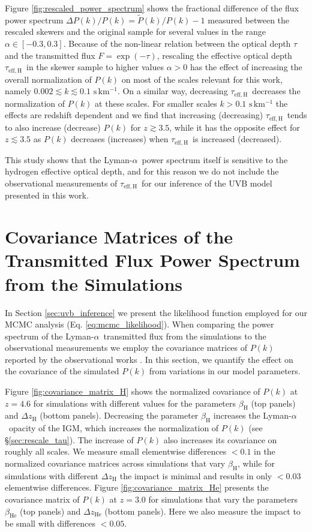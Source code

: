\documentclass[twocolumn]{aastex62}
\newcommand\Lya{Lyman-$\alpha$}
\newcommand\taueffH{$\tau_{\mathrm{eff,H}}$~}
\begin{document}
Figure \ref{fig:rescaled_power_spectrum} shows the fractional difference of the flux power 
spectrum  $\Delta P(k) / P(k) = \widetilde{P}(k)/P(k) - 1 $  
measured between the rescaled skewers and
the original sample for several values 
in the range $\alpha\in[-0.3, 0.3]$.
Because of the non-linear relation between the optical depth $\tau$ and the transmitted flux $F =\exp(-\tau)$, 
rescaling the effective optical depth \taueffH in the skewer sample to higher 
values $\alpha>0$ has the effect of increasing the overall normalization of $P(k)$ on most of
the scales relevant for this work, namely $0.002 \lesssim k \lesssim 0.1 \,\, \mathrm{s\,km^{-1}}$. 
On a similar way, decreasing \taueffH decreases the normalization of $P(k)$ at these scales. For smaller scales 
$k > 0.1 \,\, \mathrm{s\,km^{-1}}$ the effects are redshift dependent and we find that increasing (decreasing) \taueffH tends
to also increase (decrease) $P(k)$ for $z\gtrsim 3.5$, while it has the opposite effect for $z\lesssim 3.5$ as $P(k)$ decreases (increases)
when \taueffH is increased (decreased).

This study shows that the \Lya\ power spectrum itself is sensitive
to the hydrogen effective optical depth, and for this reason
we do not include the observational measurements of \taueffH for our inference of the UVB model presented in this work.           


\section{Covariance Matrices of the Transmitted Flux Power Spectrum from the Simulations  } 
\label{sec:covariance_matrices}


In Section \ref{sec:uvb_inference} we present the likelihood function employed for our MCMC analysis (Eq. \ref{eq:mcmc_likelihood}). When
comparing the power spectrum of the \Lya\ transmitted flux from the simulations to the observational measurements
we employ the covariance matrices 
of $P(k)$ reported by the observational works \citep{Chabanier+2019, Irsic+2017a, boera2019a}.
In this section, we quantify 
the effect on the covariance of the simulated $P(k)$ from variations in our model 
parameters.

Figure \ref{fig:covariance_matrix_H} shows the normalized covariance of $P(k)$ at $z=4.6$ for simulations with different 
values for the parameters $\beta_{\mathrm{H}}$ (top panels) and $\Delta z_{\mathrm{H}}$ (bottom panels). 
Decreasing the parameter $\beta_{\mathrm{H}}$ increases the \Lya\ opacity of the IGM,
which increases the normalization of $P(k)$ (see \S\ref{sec:rescale_tau}). The increase of $P(k)$ also increases its covariance on 
roughly all scales. We measure small elementwise differences $<0.1$ in the normalized covariance matrices across simulations that 
vary $\beta_{\mathrm{H}}$, while for simulations with different $\Delta z_{\mathrm{H}}$ the impact is minimal and results in 
only $< 0.03$ elementwise differences. Figure \ref{fig:covariance_matrix_He} presents the covariance matrix of $P(k)$ at $z=3.0$ for 
simulations that vary the parameters $\beta_{\mathrm{He}}$ (top panels) and $\Delta z_{\mathrm{He}}$ (bottom panels). Here we also measure the impact 
to be small with differences $<0.05$.  
\end{document}
